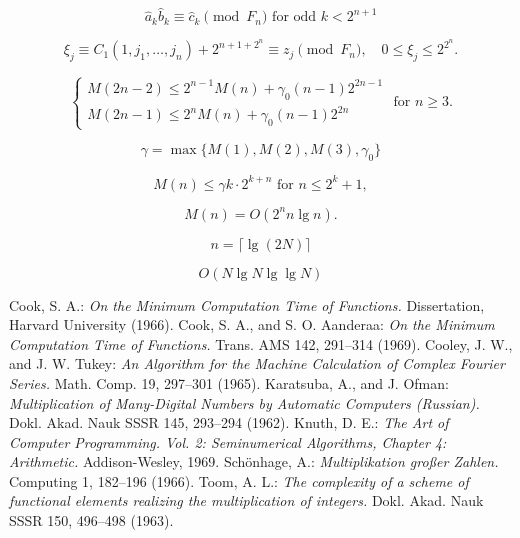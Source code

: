 \documentclass{article}
\begin{document}
\[
\hat{a}_k \hat{b}_k \equiv \hat{c}_k \pmod{F_n}\text{ for odd }k < 2^{n + 1}
\]

\[
\xi_j \equiv C_1(1, j_1, \ldots, j_n) + 2^{n + 1 + 2^n} \equiv z_j \pmod{F_n}, \quad 0 \le \xi_j \le 2^{2^n}.
\]

\[
\tag{4.15}
\begin{cases}
M(2n - 2) \le 2^{n - 1} M(n) + \gamma_0 (n - 1) 2^{2n - 1} \\
M (2n - 1) \le 2^n M(n) + \gamma_0 (n - 1) 2^{2n}
\end{cases} \text{ for } n \ge 3.
\]

\[
\gamma = \max \{M(1), M(2), M(3), \gamma_0\}
\]

\[
M(n) \le \gamma k \cdot 2^{k + n}\text{ for } n \le 2^k + 1,
\]

\[
M(n) = O(2^n n \lg n).
\]

\[
n = \lceil \lg(2N)\rceil
\]

\[
O(N \lg N \lg \lg N)
\]

\begin{thebibliography}{99}
 Cook, S. A.: \textit{On the Minimum Computation Time of Functions.} Dissertation, Harvard University (1966).
 Cook, S. A., and S. O. Aanderaa: \textit{On the Minimum Computation Time of Functions.} Trans. AMS 142, 291--314 (1969).
 Cooley, J. W., and J. W. Tukey: \textit{An Algorithm for the Machine Calculation of Complex Fourier Series.} Math. Comp. 19, 297--301 (1965).
 Karatsuba, A., and J. Ofman: \textit{Multiplication of Many-Digital Numbers by Automatic Computers (Russian).} Dokl. Akad. Nauk SSSR 145, 293--294 (1962).
 Knuth, D. E.: \textit{The Art of Computer Programming. Vol. 2: Seminumerical Algorithms, Chapter 4: Arithmetic.} Addison-Wesley, 1969.
 Schönhage, A.: \textit{Multiplikation großer Zahlen.} Computing 1, 182--196 (1966).
 Toom, A. L.: \textit{The complexity of a scheme of functional elements realizing the multiplication of integers.} Dokl. Akad. Nauk SSSR 150, 496--498 (1963).
\end{thebibliography}
\end{document}
